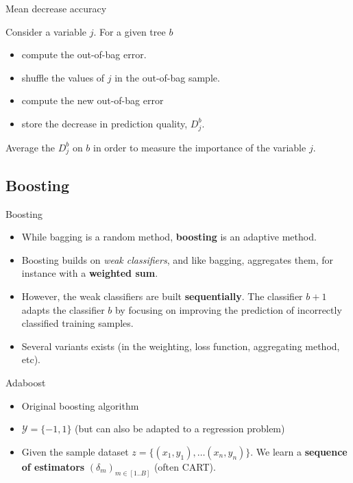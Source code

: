 \documentclass[usenames,dvipsnames]{beamer}
\begin{document}
\begin{frame}{Mean decrease accuracy}

    Consider a variable $j$.
    For a given tree $b$
   \begin{itemize}
       \item compute the out-of-bag error.
	\item shuffle the values of $j$ in the out-of-bag sample.
	\item compute the new out-of-bag error
	\item store the decrease in prediction quality, $D_j^b$.
   \end{itemize} 

    Average the $D_j^b$ on $b$ in order to measure the importance of the variable $j$.
\end{frame}

\subsection{Boosting}%
\label{sub:boosting}

\begin{frame}{Boosting}
    \begin{itemize}
        \item While bagging is a random method, \textbf{{boosting}} is an adaptive method.
	\item Boosting builds on \textit{{weak classifiers}}, and like bagging, aggregates them, for instance with a \textbf{{weighted sum}}.
	\item However, the weak classifiers are built \textbf{{sequentially}}. The classifier $b+1$ adapts the classifier $b$ by focusing on improving the prediction of incorrectly classified training samples.
	\item Several variants exists (in the weighting, loss function, aggregating method, etc).
    \end{itemize}
\end{frame}

\begin{frame}{Adaboost}
    \begin{itemize}
	\item  Original boosting algorithm \cite{Freund1996} 
	\item $ \mathcal{Y}  = \{-1, 1\}$ (but can also be adapted to a regression problem)
	\item  Given the sample dataset $z =  \{(x_{1}, y_{1}), \dots (x_{n}, y_{n})\}$. We learn a \textbf{{sequence of estimators}} $(\delta_m)_{m\in [1..B]}$ (often CART).
    \end{itemize}
\end{frame}
\end{document}
